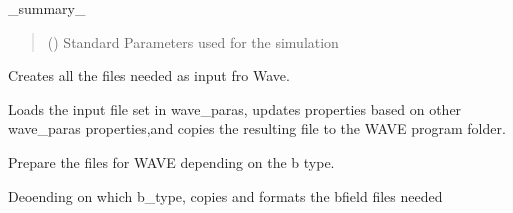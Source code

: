 \documentclass[letterpaper,10pt,english]{sphinxmanual}
\begin{document}
\begin{fulllineitems}
\label{\detokenize{API:wavepy.preprocess_wave_files.PreprocessWaveFiles}}
\pysigstartsignatures
{}
\pysigstopsignatures
\sphinxAtStartPar
\_summary\_
\begin{quote}\begin{description}
\sphinxAtStartPar
{} ({\hyperref[\detokenize{API:wavepy.standard_parameters.StdParameters}]{}}) \textendash{} Standard Parameters used for the simulation

\end{description}\end{quote}

\begin{fulllineitems}
\label{\detokenize{API:wavepy.preprocess_wave_files.PreprocessWaveFiles.create_wave_input}}
\pysigstartsignatures
{}
\pysigstopsignatures
\sphinxAtStartPar
Creates all the files needed as input fro Wave.

\sphinxAtStartPar
Loads the input file set in wave\_paras, updates properties
based on other wave\_paras properties,and copies the
resulting file to the WAVE program folder.

\end{fulllineitems}


\begin{fulllineitems}
\label{\detokenize{API:wavepy.preprocess_wave_files.PreprocessWaveFiles.prepare_b_files_for_wave}}
\pysigstartsignatures
{}
\pysigstopsignatures
\sphinxAtStartPar
Prepare the files for WAVE depending on the b type.

\sphinxAtStartPar
Deoending on which b\_type, copies and
formats the b\sphinxhyphen{}field files needed

\end{fulllineitems}


\end{fulllineitems}
\end{document}
